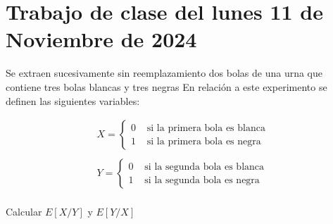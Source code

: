 \section{Trabajo de clase del lunes 11 de Noviembre de 2024}
 
\begin{ejercicio}
    Se extraen sucesivamente sin reemplazamiento dos bolas de una urna que contiene tres bolas blancas y tres negras En relación a este experimento se definen las siguientes variables:

    \begin{align*}
        X= \left\{
        \begin{array}{cl}
            0 & \text{ si la primera bola es blanca}\\
            1 & \text{ si la primera bola es negra}
        \end{array}
        \right.\\\\
        Y= \left\{
        \begin{array}{cl}
            0 & \text{ si la segunda bola es blanca}\\
            1 & \text{ si la segunda bola es negra}
        \end{array}
        \right.\\
    \end{align*}

    Calcular $E[X/Y]$ y $E[Y/X]$
    \endsquare


\end{ejercicio}
